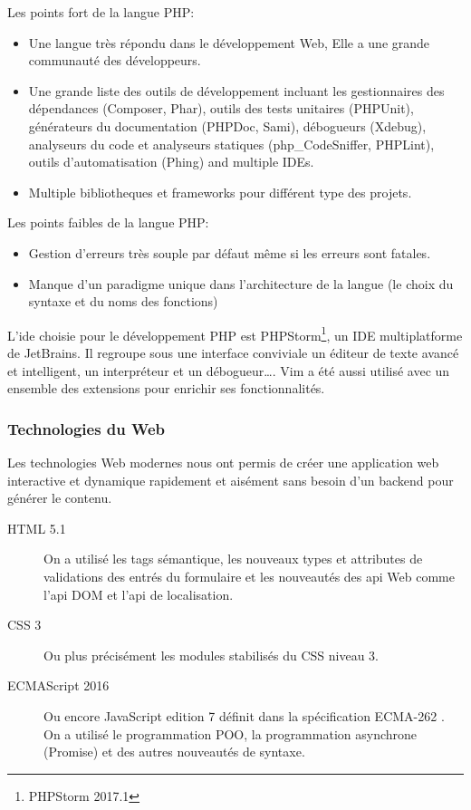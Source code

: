 Les points fort de la langue PHP:

\begin{itemize}
    \item Une langue très répondu dans le développement Web, Elle a une
        grande communauté des développeurs.
    \item Une grande liste des outils de développement incluant les
        gestionnaires des dépendances (Composer, Phar), outils des tests
        unitaires (PHPUnit), générateurs du documentation (PHPDoc, Sami),
        débogueurs (Xdebug), analyseurs du code et analyseurs statiques
        (php\_CodeSniffer, PHPLint), outils d'automatisation (Phing) and
        multiple IDEs.
    \item Multiple bibliotheques et frameworks pour différent type des projets.
\end{itemize}

Les points faibles de la langue PHP:

\begin{itemize}
    \item Gestion d'erreurs très souple par défaut même si les erreurs sont
        fatales.
    \item Manque d'un paradigme unique dans l'architecture de la langue (le
        choix du syntaxe et du noms des fonctions)
\end{itemize}

L'ide choisie pour le développement PHP est PHPStorm\footnote{PHPStorm 2017.1},
un IDE multiplatforme de JetBrains. Il regroupe sous une interface conviviale
un éditeur de texte avancé et intelligent, un interpréteur et un
débogueur\ldots. Vim a été aussi utilisé avec un ensemble des extensions pour
enrichir ses fonctionnalités.

\subsubsection{Technologies du Web}

Les technologies Web modernes nous ont permis de créer une application web
interactive et dynamique rapidement et aisément sans besoin d'un backend pour
générer le contenu.

\begin{description}
    \item [HTML 5.1] On a utilisé les tags sémantique, les nouveaux types et
        attributes de validations des entrés du formulaire et les nouveautés
        des api Web comme l'api DOM et l'api de localisation.
    \item [CSS 3] Ou plus précisément les modules stabilisés du CSS niveau 3.
    \item [ECMAScript 2016\textregistered] Ou encore JavaScript edition 7
        définit dans la spécification ECMA-262 \cite{ECMA262}. On a utilisé le
        programmation POO, la programmation asynchrone (Promise) et des autres
        nouveautés de syntaxe.
\end{description}

